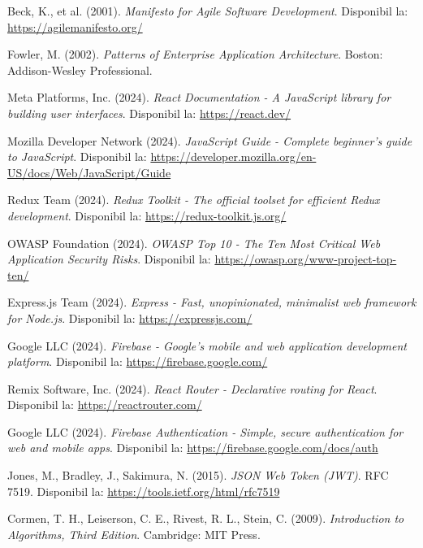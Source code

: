 \documentclass[12pt,a4paper]{report}
\begin{document}
\begin{thebibliography}{20}

Beck, K., et al. (2001). \textit{Manifesto for Agile Software Development}. Disponibil la: \url{https://agilemanifesto.org/}

Fowler, M. (2002). \textit{Patterns of Enterprise Application Architecture}. Boston: Addison-Wesley Professional.

Meta Platforms, Inc. (2024). \textit{React Documentation - A JavaScript library for building user interfaces}. Disponibil la: \url{https://react.dev/}

Mozilla Developer Network (2024). \textit{JavaScript Guide - Complete beginner's guide to JavaScript}. Disponibil la: \url{https://developer.mozilla.org/en-US/docs/Web/JavaScript/Guide}

Redux Team (2024). \textit{Redux Toolkit - The official toolset for efficient Redux development}. Disponibil la: \url{https://redux-toolkit.js.org/}

OWASP Foundation (2024). \textit{OWASP Top 10 - The Ten Most Critical Web Application Security Risks}. Disponibil la: \url{https://owasp.org/www-project-top-ten/}

Express.js Team (2024). \textit{Express - Fast, unopinionated, minimalist web framework for Node.js}. Disponibil la: \url{https://expressjs.com/}

Google LLC (2024). \textit{Firebase - Google's mobile and web application development platform}. Disponibil la: \url{https://firebase.google.com/}

Remix Software, Inc. (2024). \textit{React Router - Declarative routing for React}. Disponibil la: \url{https://reactrouter.com/}

Google LLC (2024). \textit{Firebase Authentication - Simple, secure authentication for web and mobile apps}. Disponibil la: \url{https://firebase.google.com/docs/auth}

Jones, M., Bradley, J., Sakimura, N. (2015). \textit{JSON Web Token (JWT)}. RFC 7519. Disponibil la: \url{https://tools.ietf.org/html/rfc7519}

Cormen, T. H., Leiserson, C. E., Rivest, R. L., Stein, C. (2009). \textit{Introduction to Algorithms, Third Edition}. Cambridge: MIT Press.


\end{thebibliography}
\end{document}
